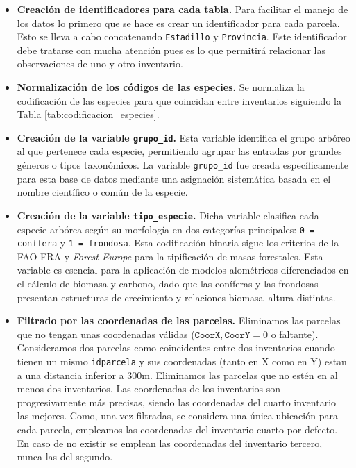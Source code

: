 \begin{itemize}
    \item \textbf{Creación de identificadores para cada tabla.} Para facilitar el manejo de los datos lo primero que se hace es crear un identificador para cada parcela. Esto se lleva a cabo concatenando \texttt{Estadillo} y \texttt{Provincia}. Este identificador debe tratarse con mucha atención pues es lo que permitirá relacionar las observaciones de uno y otro inventario.
    
    \medskip
    
    \item \textbf{Normalización de los códigos de las especies.} Se normaliza la codificación de las especies para que coincidan entre inventarios siguiendo la Tabla \ref{tab:codificacion_especies}. 

    \medskip

    \item \textbf{Creación de la variable \texttt{grupo\_id}.} Esta variable identifica el grupo arbóreo al que pertenece cada especie, permitiendo agrupar las entradas por grandes géneros o tipos taxonómicos. La variable \texttt{grupo\_id} fue creada específicamente para esta base de datos mediante una asignación sistemática basada en el nombre científico o común de la especie. 
    \medskip

\item \textbf{Creación de la variable \texttt{tipo\_especie}.} Dicha variable clasifica cada especie arbórea según su morfología en dos categorías principales: \texttt{0 = conífera} y \texttt{1 = frondosa}. Esta codificación binaria sigue los criterios de la FAO FRA y \textit{Forest Europe} para la tipificación de masas forestales. Esta variable es esencial para la aplicación de modelos alométricos diferenciados en el cálculo de biomasa y carbono, dado que las coníferas y las frondosas presentan estructuras de crecimiento y relaciones biomasa–altura distintas.

    \medskip

    \item \textbf{Filtrado por las coordenadas de las parcelas. } Eliminamos las parcelas que no tengan unas coordenadas válidas ($\texttt{CoorX}, \texttt{CoorY} =0$ o faltante). Consideramos dos parcelas como coincidentes entre dos inventarios cuando  tienen un mismo \texttt{idparcela} y sus coordenadas (tanto en X como en Y) estan a una distancia inferior a $300$m. Eliminamos las parcelas que no estén en al menos dos inventarios. Las coordenadas de los inventarios son progresivamente más precisas, siendo las coordenadas del cuarto inventario las mejores. Como, una vez filtradas, se considera una única ubicación para cada parcela, empleamos las coordenadas del inventario cuarto por defecto. En caso de no existir se emplean las coordenadas del inventario tercero, nunca las del segundo. 


\end{itemize}
